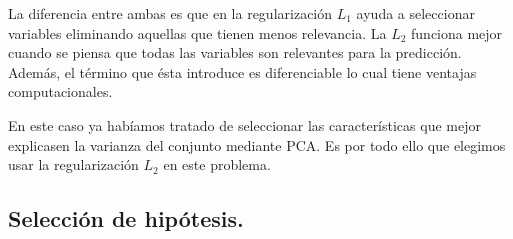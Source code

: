 \documentclass[a4paper, 20pt]{article}
\begin{document}
La diferencia entre ambas es que en la regularización $L_1$ ayuda a seleccionar variables eliminando aquellas que tienen menos relevancia. La $L_2$ funciona mejor cuando se piensa que todas las variables son relevantes para la predicción. Además, el término que ésta introduce es diferenciable lo cual tiene ventajas computacionales. 

En este caso ya habíamos tratado de seleccionar las características que mejor explicasen la varianza del conjunto mediante PCA. Es por todo ello que elegimos usar la regularización $L_2$ en este problema. 



\subsection{Selección de hipótesis.}
\newpage
\printbibliography
\end{document}

